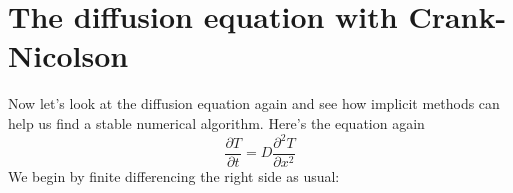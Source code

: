 \documentclass{book}
\theoremstyle{plain}
\theoremstyle{definition}
\numberwithin{exm}{chapter}
\theoremstyle{remark}
\theoremstyle{summary}
\theoremstyle{overview}
\begin{document}
\section*{The diffusion equation with Crank-Nicolson}

Now let\rq s look at the diffusion equation again and see how implicit methods can
help us find a stable numerical algorithm. Here\rq s the equation again
\begin{equation}\label{eq:715}
\frac{\partial T}{\partial t}=D \frac{\partial^{2} T}{\partial x^{2}}
\end{equation}
We begin by finite differencing the right side as usual:
\end{document}
